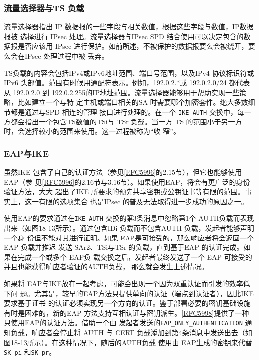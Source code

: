 \subsubsection{流量选择器与TS 负载}
流量选择器指出 IP 数据报的一些字段与相关数值，根据这些字段与数值，IP数据报被
选择进行 IPsec 处理。流量选择器与IPsec SPD 结合使用可以决定包含的数据报是否应该用
IPsec 进行保护。如前所述，不被保护的数据报要么会被绕开，要么会在IPsec 处理过程中被
丢弃。

TS负载的内容会包括IPv4或IPv6地址范围、端口号范围，以及IPv4 协议标识符或
IPv6 头部值。范围有时候用通配符表示。例如，192.0.2.*或 192.0.2.0/24 都代表从 192.0.2.0
到 192.0.2.255的IP地址范围。流量选择器能够用于帮助实现一些策略，比如建立一个与特
定主机或端口相关的SA 时需要哪个加密套件。绝大多数细节都是通过与SPD 相连的管理
接口进行处理的。在一个 \verb|IKE_AUTH| 交换中，每一方都会指出一个包含TS数值的TSi与
TSr 负载。当一方 TS 的范围小于另一方时，会选择较小的范围来使用。这一过程被称为“收
窄”。

\subsubsection{EAP与IKE}
虽然IKE 包含了自己的认证方法（参见\href{https://www.rfc-editor.org/rfc/rfc5996}{[RFC5996]}的2.15节），但它也能够使用EAP（参
见\href{https://www.rfc-editor.org/rfc/rfc5996}{[RFC5996]}的2.16节与3.16节）。如果使用EAP，将会有更广泛的身份验证方法，大大
超出了IKE 所要求的预先共享密钥或公钥证书等有限的范围。事实上，这一有限的选项集合
也是IPsec 的普及无法取得进一步成功的原因之一。

使用EAP的要求通过在\verb|IKE_AUTH| 交换的第3条消息中忽略第1个 AUTH负载而表现
出来（如图18-13所示）。通过包含IDi 负载而不包含AUTH 负载，发起者能够声明一个身
份但不能对其进行证明。如果 EAP是可接受的，那么响应者将会返回一个 EAP 负载并推迟
发送 SAr2、TSi与TSr 的负载，直到基于EAP 的认证完成。如果在完成一个或多个 EAP负
载交换之后，发起者最终发送了一个 EAP 可接受的并且也能获得响应者验证的AUTH负载，
那么就会发生上述情况。

如果将 EAP与IKE放在一起考虑，可能会出现一个因为双重认证而引发的效率低下问
题。尤其是，较早的EAP方法只提供单向的认证（端点到认证者），因此IKE要求基于证书
的认证必须实现另一个方向的认证。鉴于部署必要的密钥基础设施有时是困难的，新的EAP
方法支持互相认证与密钥派生。\href{https://www.rfc-editor.org/rfc/rfc5998}{[RFC5998]}提供了一种只使用EAP的认证方法。借助一个由
发起者发送的\verb|EAP_ONLY_AUTHENTICATION| 通知负载，响应者会停止将 AUTH 与 CERT
负载添加到第4条消息中发送出去（如图18-13所示）。在这种情况下，随后的AUTH负载
使用由 EAP生成的密钥来代替\verb|SK_pi| 和\verb|SK_pr|。

